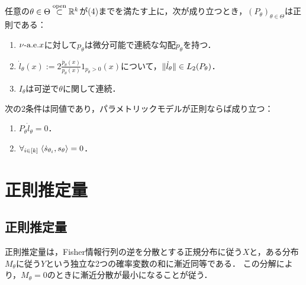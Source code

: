 \documentclass[uplatex,dvipdfmx]{jsreport}
\begin{document}
\begin{lemma}[正則性の十分条件]
    任意の$\theta\in\Theta\overset{\mathrm{open}}{\subset}\mathbb{R}^k$が(4)までを満たす上に，次が成り立つとき，$(P_\theta)_{\theta\in\Theta}$は正則である：
    \begin{enumerate}
        \item $\nu\text{-a.e.} x$に対して$p_\theta$は微分可能で連続な勾配$\dot{p}_\theta$を持つ．
        \item $\dot{l}_\theta(x):=2\frac{\dot{p}_\theta(x)}{p_\theta(x)}1_{p_\theta>0}(x)$について，$\|\dot{l}_\theta\|\in L_2(P_\theta)$．
        \item $I_\theta$は可逆で$\theta$に関して連続．
    \end{enumerate}
\end{lemma}

\begin{lemma}
    次の2条件は同値であり，パラメトリックモデルが正則ならば成り立つ：
    \begin{enumerate}
        \item $P_\theta\dot{l}_\theta=0$．
        \item $\forall_{i\in[k]}\;\langle\dot{s}_{\theta_i},s_\theta\rangle=0$．
    \end{enumerate}
\end{lemma}

\section{正則推定量}

\subsection{正則推定量}

\begin{tcolorbox}[colframe=ForestGreen, colback=ForestGreen!10!white,breakable,colbacktitle=ForestGreen!40!white,coltitle=black,fonttitle=\bfseries\sffamily,
title=]
    正則推定量は，Fisher情報行列の逆を分散とする正規分布に従う$X$と，ある分布$M_\theta$に従う$Y$という独立な2つの確率変数の和に漸近同等である．
    この分解により，$M_\theta=0$のときに漸近分散が最小になることが従う．
\end{tcolorbox}
\end{document}
